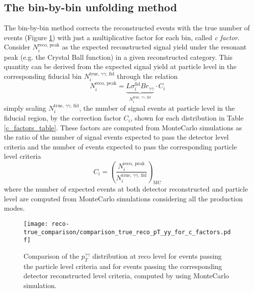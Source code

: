 \subsection{The bin-by-bin unfolding method}
\label{c_factors_sec}
The bin-by-bin method corrects the reconstructed events with the true number of events (Figure \ref{true/reco}) with just a multiplicative factor for each bin, called \emph{c factor}.
\\
Consider $N_i^{\text{reco, peak}}$ as the expected reconstructed signal yield under the resonant peak (e.g. the Crystal Ball function) in a given reconstructed category. This quantity can be derived from the expected signal yield at particle level in the corresponding fiducial bin $N_i^\text{true, $\gamma\gamma$, fid}$ through the relation
\begin{equation}
N^\text{reco, peak}_i = \underbrace{L \sigma_i^\text{fid} Br_{\gamma\gamma}}_{N_i^\text{true, $\gamma\gamma$, fid}} \cdot C_i
\end{equation}
simply scaling $N_i^{\text{true, }\gamma\gamma \text{, fid}}$, the number of signal events at particle level in the fiducial region, by the correction factor $C_i$, shown for each distribution in Table \ref{c_factors_table}. These factors are computed from MonteCarlo simulations as the ratio of the number of signal events expected to pass the detector level criteria and the number of events expected to pass the corresponding particle level criteria
\begin{equation}
C_i = \left(\frac{N^\text{reco, peak}_i}{N_i^\text{true, $\gamma\gamma$, fid}}\right)_\text{MC}
\end{equation}
where the number of expected events at both detector reconstructed and particle level are computed from MonteCarlo simulations considering all the production modes.
\begin{figure}[b!]
\centering
\texttt{[image: reco-true\_comparison/comparison\_true\_reco\_pT\_yy\_for\_c\_factors.pdf]}
\caption{Comparison of the $p_T^{\gamma\gamma}$ distribution at reco level for events passing the particle level criteria and for events passing the corresponding detector reconstructed level criteria, computed by using MonteCarlo simulation.}
\label{true/reco}
\end{figure}
